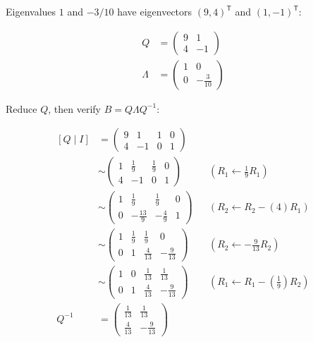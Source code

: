 \documentclass[11pt]{article}
\begin{document}
Eigenvalues \(1\) and \(-3/10\) have eigenvectors \((9,4)^{\mathsf T}\) and \((1,-1)^{\mathsf T}\):

\begin{align*}Q &= \begin{pmatrix}9 & 1 \\ 4 & -1\end{pmatrix} \\
\Lambda &= \begin{pmatrix}1 & 0 \\ 0 & -\frac{3}{10}\end{pmatrix}\end{align*}

Reduce \(Q\), then verify \(B=Q\Lambda Q^{-1}\):

\[\begin{aligned}\left[Q\mid I\right] &= \begin{pmatrix}9 & 1 & 1 & 0 \\ 4 & -1 & 0 & 1\end{pmatrix} \\
&\sim \begin{pmatrix}1 & \frac{1}{9} & \frac{1}{9} & 0 \\ 4 & -1 & 0 & 1\end{pmatrix} && \left(R_{1}\leftarrow \frac{1}{9}R_{1}\right) \\
&\sim \begin{pmatrix}1 & \frac{1}{9} & \frac{1}{9} & 0 \\ 0 & -\frac{13}{9} & -\frac{4}{9} & 1\end{pmatrix} && \left(R_{2}\leftarrow R_{2}-\left(4\right)R_{1}\right) \\
&\sim \begin{pmatrix}1 & \frac{1}{9} & \frac{1}{9} & 0 \\ 0 & 1 & \frac{4}{13} & -\frac{9}{13}\end{pmatrix} && \left(R_{2}\leftarrow -\frac{9}{13}R_{2}\right) \\
&\sim \begin{pmatrix}1 & 0 & \frac{1}{13} & \frac{1}{13} \\ 0 & 1 & \frac{4}{13} & -\frac{9}{13}\end{pmatrix} && \left(R_{1}\leftarrow R_{1}-\left(\frac{1}{9}\right)R_{2}\right) \\
Q^{-1} &= \begin{pmatrix}\frac{1}{13} & \frac{1}{13} \\ \frac{4}{13} & -\frac{9}{13}\end{pmatrix}\end{aligned}\]
\end{document}
